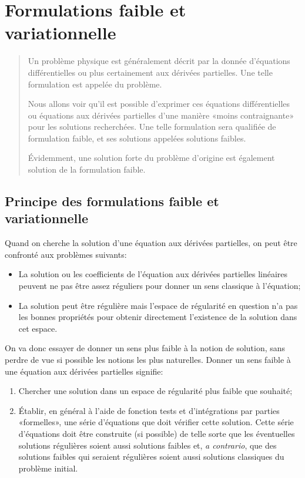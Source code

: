 \chapter{Formulations faible et variationnelle}\label{Ch_FFaible}
\begin{abstract}
Un problème physique est généralement décrit par la donnée d'équations différentielles ou plus certainement aux dérivées partielles. Une telle formulation est appelée  du problème.

Nous allons voir qu'il est possible d'exprimer ces équations différentielles ou équations aux dérivées partielles d'une manière «moins contraignante» pour les solutions recherchées. Une telle formulation sera qualifiée de formulation faible, et ses solutions appelées solutions faibles.

Évidemment, une solution forte du problème d'origine est également solution de la formulation faible.
\end{abstract}


\medskip
\section{Principe des formulations faible et variationnelle}
Quand on cherche la solution d'une équation aux dérivées partielles, on peut être confronté aux problèmes suivants:
\begin{itemize}
  \item La solution ou les coefficients de l'équation aux dérivées partielles linéaires peuvent ne pas être assez réguliers pour donner un sens classique à l'équation;
  \item La solution peut être régulière mais l'espace de régularité en question n'a pas les bonnes propriétés pour obtenir directement l'existence de la solution dans cet espace.
\end{itemize}


\medskip
On va donc essayer de donner un sens plus faible à la notion de solution, sans perdre de vue si possible les notions les plus naturelles. Donner un sens faible à une équation aux dérivées partielles signifie:
\begin{enumerate}
  \item Chercher une solution dans un espace de régularité plus faible que souhaité;
  \item Établir, en général à l'aide de fonction tests et d'intégrations par parties «formelles», une série d'équations que doit vérifier cette solution. Cette série  d'équations doit être construite (si possible) de telle sorte que les éventuelles 	solutions régulières soient aussi solutions faibles et, \emph{a contrario}, que des solutions faibles qui seraient régulières soient aussi solutions classiques du problème initial.
\end{enumerate}



